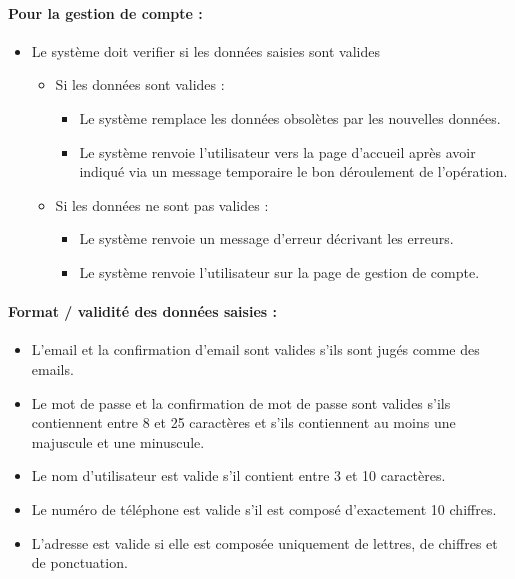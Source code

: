 \documentclass{article}
\begin{document}
\paragraph{Pour la gestion de compte : }
\begin{itemize}
\item Le système doit verifier si les données saisies sont valides
	\begin{itemize}
	\item Si les données sont valides :
		\begin{itemize}
		\item Le système remplace les données obsolètes par
                  les nouvelles données.
                \item Le système renvoie l'utilisateur vers la page d'accueil
                 après avoir indiqué via un message temporaire le bon déroulement de l'opération.
		\end{itemize}
		\item Si les données ne sont pas valides :
		\begin{itemize}
		\item Le système renvoie un message d'erreur décrivant
                  les erreurs.
                \item Le système renvoie l'utilisateur sur la page de
                  gestion de compte.
		\end{itemize}
	\end{itemize}
\end{itemize}

\paragraph{Format / validité des données saisies :}
\begin{itemize}
\item L'email et la confirmation d'email sont valides s'ils sont jugés comme des emails.

\item Le mot de passe et la confirmation de mot de passe sont valides s'ils contiennent entre 8 et 25
  caractères et s'ils contiennent au moins une majuscule et une minuscule.

\item Le nom d'utilisateur est valide s'il contient entre 3 et 10
  caractères.

\item Le numéro de téléphone est valide s'il est composé d'exactement
  10 chiffres.

\item L'adresse est valide si elle est composée uniquement de lettres,
  de chiffres et de ponctuation.
\end{itemize}
\end{document}
